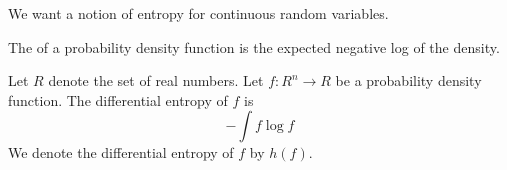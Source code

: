 
\sbasic



























\sstart
{}


We want a notion of entropy
for continuous random variables.


The 
of a probability density function
is the expected negative log
of the density.


Let $R$ denote the set of
real numbers.
Let $f: R^n \to R$ be
a probability density function.
The differential entropy of $f$
is
\[
  - \int f \log f
\]
We denote the differential entropy
of $f$ by $h(f)$.
\strats

